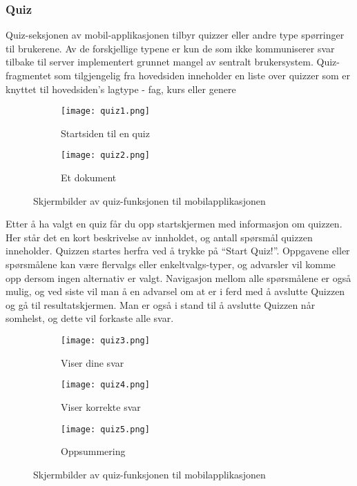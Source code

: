 \documentclass[../main.tex]{subfiles}
\begin{document}
\subsubsection{Quiz}

Quiz-seksjonen av mobil-applikasjonen tilbyr quizzer eller andre type spørringer til brukerene. Av de forskjellige typene er kun de som ikke kommuniserer svar tilbake til server implementert grunnet mangel av sentralt brukersystem.
Quiz-fragmentet som tilgjengelig fra hovedsiden inneholder en liste over quizzer som er knyttet til hovedsiden’s lagtype - fag, kurs eller genere

\begin{figure}[H]
        \centering
        \begin{subfigure}[b]{0.3\textwidth}
                \centering
                \texttt{[image: quiz1.png]}
                \caption{Startsiden til en quiz}
        \end{subfigure}
        \quad
        \begin{subfigure}[b]{0.3\textwidth}
                \centering
                \texttt{[image: quiz2.png]}
                \caption{Et dokument}
        \end{subfigure}
        \caption{Skjermbilder av quiz-funksjonen til mobilapplikasjonen}
\end{figure}

Etter å ha valgt en quiz får du opp startskjermen med informasjon om quizzen. Her står det en kort beskrivelse av innholdet, og antall spørsmål quizzen inneholder. Quizzen startes herfra ved å trykke på “Start Quiz!”.
Oppgavene eller spørsmålene kan være flervalgs eller enkeltvalgs-typer, og advarsler vil komme opp dersom ingen alternativ er valgt. Navigasjon mellom alle spørsmålene er også mulig, og ved siste vil man å en advarsel om at er i ferd med å avslutte Quizzen og gå til resultatskjermen. Man er også i stand til å avslutte Quizzen når somhelst, og dette vil forkaste alle svar.

\begin{figure}[H]
        \centering
        \begin{subfigure}[b]{0.3\textwidth}
                \centering
                \texttt{[image: quiz3.png]}
                \caption{Viser dine svar}
        \end{subfigure}
        \quad
        \begin{subfigure}[b]{0.3\textwidth}
                \centering
                \texttt{[image: quiz4.png]}
                \caption{Viser korrekte svar}
        \end{subfigure}
        \quad
                \begin{subfigure}[b]{0.3\textwidth}
                        \centering
                        \texttt{[image: quiz5.png]}
                        \caption{Oppsummering}
                \end{subfigure}
        \caption{Skjermbilder av quiz-funksjonen til mobilapplikasjonen}
\end{figure}
\end{document}
